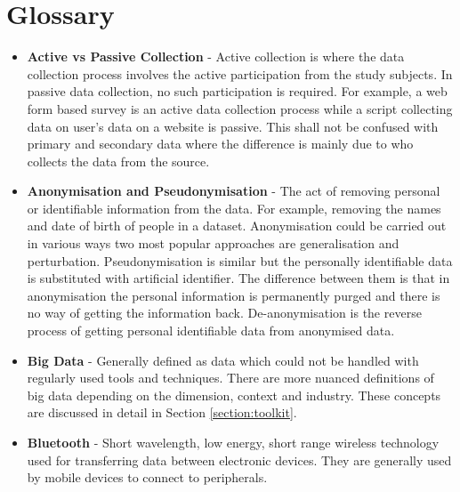 
\setcounter{secnumdepth}{2}
\setcounter{tocdepth}{1}
\tableofcontents
\listoffigures 
\listoftables

\chapter*{Glossary} \label{front:glossary}

\begin{itemize}
  \item \textbf{Active vs Passive Collection} - Active collection is where the data collection process involves the active participation from the study subjects. In passive data collection, no such participation is required. For example, a web form based survey is an active data collection process while a script collecting data on user's data on a website is passive. This shall not be confused with primary and secondary data where the difference is mainly due to who collects the data from the source.

  \item \textbf{Anonymisation and Pseudonymisation } - The act of removing personal or identifiable information from the data. For example, removing the names and date of birth of people in a dataset. Anonymisation could be carried out in various ways two most popular approaches are generalisation and perturbation. Pseudonymisation is similar but the personally identifiable data is substituted with artificial identifier. The difference between them is that in anonymisation the personal information is permanently purged and there is no way of getting the information back. De-anonymisation is the reverse process of getting personal identifiable data from anonymised data.
    
  \item \textbf{Big Data} - Generally defined as data which could not be handled with regularly used tools and techniques. There are more nuanced definitions of big data depending on the dimension, context and industry. These concepts are discussed in detail in Section \ref{section:toolkit}.

  \item \textbf{Bluetooth} - Short wavelength, low energy, short range wireless technology used for transferring data between electronic devices. They are generally used by mobile devices to connect to peripherals. 


\end{itemize}
